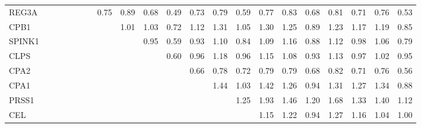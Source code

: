 \begin{longtable}{lrrrrrrrrrrrrrrrrrrrr}
REG3A    &              &              &              &             &             &             &       0.75 &         0.89 &       0.68 &       0.49 &       0.73 &        0.79 &      0.59 &        0.77 &           0.83 &          0.68 &      0.81 &        0.71 &        0.76 &       0.53 \\
CPB1     &              &              &              &             &             &             &            &         1.01 &       1.03 &       0.72 &       1.12 &        1.31 &      1.05 &        1.30 &           1.25 &          0.89 &      1.23 &        1.17 &        1.19 &       0.85 \\
SPINK1   &              &              &              &             &             &             &            &              &       0.95 &       0.59 &       0.93 &        1.10 &      0.84 &        1.09 &           1.16 &          0.88 &      1.12 &        0.98 &        1.06 &       0.79 \\
CLPS     &              &              &              &             &             &             &            &              &            &       0.60 &       0.96 &        1.18 &      0.96 &        1.15 &           1.08 &          0.93 &      1.13 &        0.97 &        1.02 &       0.95 \\
CPA2     &              &              &              &             &             &             &            &              &            &            &       0.66 &        0.78 &      0.72 &        0.79 &           0.79 &          0.68 &      0.82 &        0.71 &        0.76 &       0.56 \\
CPA1     &              &              &              &             &             &             &            &              &            &            &            &        1.44 &      1.03 &        1.42 &           1.26 &          0.94 &      1.31 &        1.27 &        1.34 &       0.88 \\
PRSS1    &              &              &              &             &             &             &            &              &            &            &            &             &      1.25 &        1.93 &           1.46 &          1.20 &      1.68 &        1.33 &        1.40 &       1.12 \\
CEL      &              &              &              &             &             &             &            &              &            &            &            &             &           &        1.15 &           1.22 &          0.94 &      1.27 &        1.16 &        1.04 &       1.00 \\

\end{longtable}
